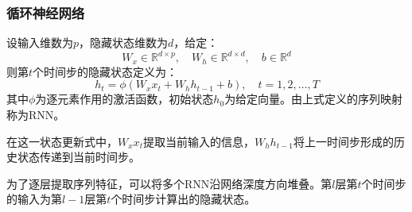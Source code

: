 \subsubsection{循环神经网络}
\begin{definition}
	设输入维数为$p$，隐藏状态维数为$d$，给定：
	\begin{equation*}
		W_x\in\mathbb{R}^{d\times p},\quad W_h\in\mathbb{R}^{d\times d},\quad b\in\mathbb{R}^d
	\end{equation*}
	则第$t$个时间步的隐藏状态定义为：
	\begin{equation*}
		h_t=\phi(W_xx_t+W_hh_{t-1}+b),\quad t=1,2,\dots,T
	\end{equation*}
	其中$\phi$为逐元素作用的激活函数，初始状态$h_0$为给定向量。由上式定义的序列映射称为\gls{RNN}。
\end{definition}
在这一状态更新式中，$W_xx_t$提取当前输入的信息，$W_hh_{t-1}$将上一时间步形成的历史状态传递到当前时间步。\par
为了逐层提取序列特征，可以将多个RNN沿网络深度方向堆叠。第$l$层第$t$个时间步的输入为第$l-1$层第$t$个时间步计算出的隐藏状态。
